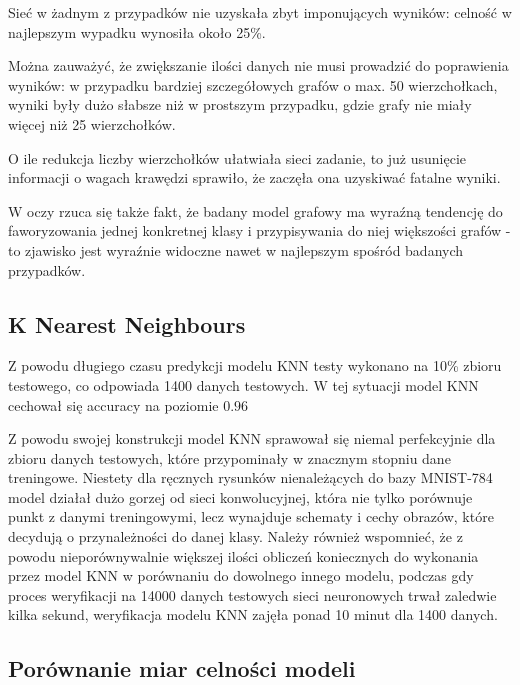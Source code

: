 \documentclass{article}
\begin{document}
Sieć w żadnym z przypadków nie uzyskała zbyt imponujących 
wyników: celność w najlepszym wypadku wynosiła około 25\%. 

Można zauważyć, że zwiększanie ilości danych nie musi 
prowadzić do poprawienia wyników: w przypadku bardziej 
szczegółowych grafów o max. 50 wierzchołkach, wyniki były 
dużo słabsze niż w prostszym przypadku, gdzie grafy nie 
miały więcej niż 25 wierzchołków.

O ile redukcja liczby wierzchołków ułatwiała sieci zadanie, 
to już usunięcie informacji o wagach krawędzi sprawiło, 
że zaczęła ona uzyskiwać fatalne wyniki.

W oczy rzuca się także fakt, że badany model grafowy ma 
wyraźną tendencję do faworyzowania jednej konkretnej klasy 
i przypisywania do niej większości grafów - to zjawisko jest 
wyraźnie widoczne nawet w najlepszym spośród badanych przypadków.

\subsection{K Nearest Neighbours}

Z powodu długiego czasu predykcji modelu KNN testy wykonano na 10\% zbioru 
testowego, co odpowiada 1400 danych testowych.
W tej sytuacji model KNN cechował się accuracy na poziomie $0.96$


Z powodu swojej konstrukcji model KNN sprawował się niemal perfekcyjnie 
dla zbioru danych testowych, które przypominały w znacznym stopniu 
dane treningowe. Niestety dla ręcznych rysunków nienależących do 
bazy MNIST-784 model działał dużo gorzej od sieci konwolucyjnej, 
która nie tylko porównuje punkt z danymi treningowymi, lecz 
wynajduje schematy i cechy obrazów, które decydują o 
przynależności do danej klasy. Należy również wspomnieć, 
że z powodu nieporównywalnie większej ilości obliczeń 
koniecznych do wykonania przez model KNN w porównaniu 
do dowolnego innego modelu, podczas gdy proces weryfikacji 
na 14000 danych testowych sieci neuronowych trwał zaledwie 
kilka sekund, weryfikacja modelu KNN zajęła ponad 10 minut dla 1400 danych.

\subsection{Porównanie miar celności modeli}
\end{document}
